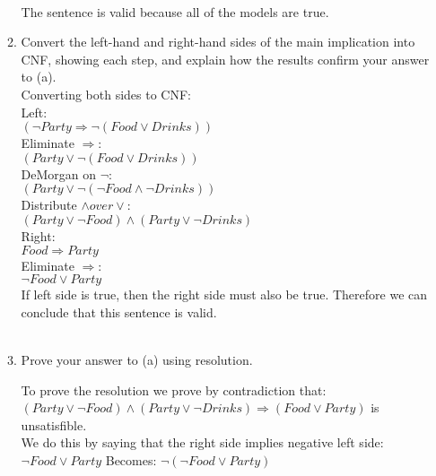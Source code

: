 \documentclass[paper=a4, fontsize=11pt]{scrartcl} %
\numberwithin{equation}{section} %
\numberwithin{figure}{section} %
\numberwithin{table}{section} %
\begin{document}
\begin{enumerate}
\begin{enumerate}
\begin{tabular*}{\textwidth}{c c c c}
		\end{tabular*}\\
		
		The sentence is valid because all of the models are true.\\
		
		\item
		Convert the left-hand and right-hand sides of the main implication into CNF, showing each step, and explain how the results confirm your answer to (a).
		\\
		
		Converting both sides to CNF:\\
		
		Left:\\
		$(\neg Party \Rightarrow \neg(Food \vee Drinks))$
		\\
		
		Eliminate $\Rightarrow$: \\
		$(Party \vee \neg(Food \vee Drinks))$
		\\
		
		DeMorgan on $\neg$: \\
		$(Party \vee \neg(\neg Food \wedge \neg Drinks))$		
		\\
		
		Distribute $\wedge over \vee$: \\
		$(Party \vee \neg Food) \wedge (Party \vee \neg Drinks)$
		\\
		
		
		Right:\\
		$Food \Rightarrow Party$
		\\
		
		Eliminate $\Rightarrow$:\\
		$\neg Food \vee Party$
		\\

		If left side is true, then the right side must also be true. Therefore we can conclude that this sentence is valid.\\
		\\
		\item
		Prove your answer to (a) using resolution.

		To prove the resolution we prove by contradiction that: $(Party \vee \neg Food) \wedge (Party \vee \neg Drinks) \Rightarrow (Food \vee Party)$ is unsatisfible.\\
		
		We do this by saying that the right side implies negative left side:\\
		$\neg Food \vee Party$ Becomes: $\neg(\neg Food \vee Party)$\\
		

\end{enumerate}
\end{enumerate}
\end{document}

